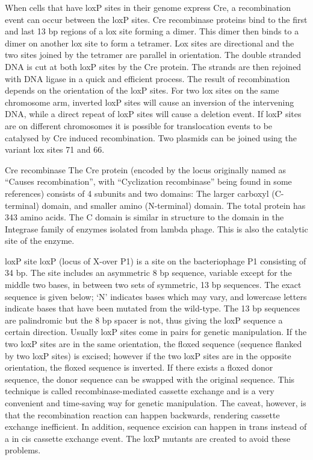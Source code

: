 When cells that have loxP sites in their genome express Cre, a recombination event can occur between the loxP sites. Cre recombinase proteins bind to the first and last 13 bp regions of a lox site forming a dimer. This dimer then binds to a dimer on another lox site to form a tetramer. Lox sites are directional and the two sites joined by the tetramer are parallel in orientation. The double stranded DNA is cut at both loxP sites by the Cre protein. The strands are then rejoined with DNA ligase in a quick and efficient process. The result of recombination depends on the orientation of the loxP sites. For two lox sites on the same chromosome arm, inverted loxP sites will cause an inversion of the intervening DNA, while a direct repeat of loxP sites will cause a deletion event. If loxP sites are on different chromosomes it is possible for translocation events to be catalysed by Cre induced recombination. Two plasmids can be joined using the variant lox sites 71 and 66.

Cre recombinase
The Cre protein (encoded by the locus originally named as ``Causes recombination'', with ``Cyclization recombinase'' being found in some references) consists of 4 subunits and two domains: The larger carboxyl (C-terminal) domain, and smaller amino (N-terminal) domain. The total protein has 343 amino acids. The C domain is similar in structure to the domain in the Integrase family of enzymes isolated from lambda phage. This is also the catalytic site of the enzyme.

loxP site
loxP (locus of X-over P1) is a site on the bacteriophage P1 consisting of 34 bp. The site includes an asymmetric 8 bp sequence, variable except for the middle two bases, in between two sets of symmetric, 13 bp sequences. The exact sequence is given below; `N' indicates bases which may vary, and lowercase letters indicate bases that have been mutated from the wild-type. The 13 bp sequences are palindromic but the 8 bp spacer is not, thus giving the loxP sequence a certain direction. Usually loxP sites come in pairs for genetic manipulation. If the two loxP sites are in the same orientation, the floxed sequence (sequence flanked by two loxP sites) is excised; however if the two loxP sites are in the opposite orientation, the floxed sequence is inverted. If there exists a floxed donor sequence, the donor sequence can be swapped with the original sequence. This technique is called recombinase-mediated cassette exchange and is a very convenient and time-saving way for genetic manipulation. The caveat, however, is that the recombination reaction can happen backwards, rendering cassette exchange inefficient. In addition, sequence excision can happen in trans instead of a in cis cassette exchange event. The loxP mutants are created to avoid these problems.

